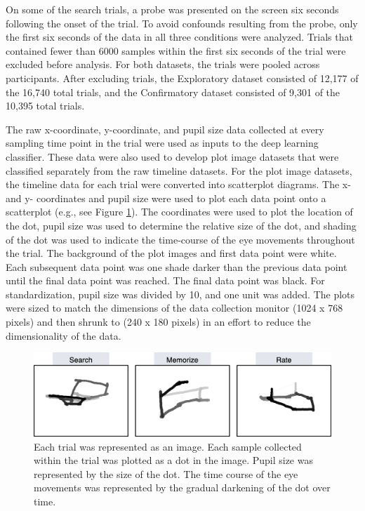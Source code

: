 \documentclass[
  english,
  man,floatsintext]{apa6}
\begin{document}
On some of the search trials, a probe was presented on the screen six seconds following the onset of the trial. To avoid confounds resulting from the probe, only the first six seconds of the data in all three conditions were analyzed. Trials that contained fewer than 6000 samples within the first six seconds of the trial were excluded before analysis. For both datasets, the trials were pooled across participants. After excluding trials, the Exploratory dataset consisted of 12,177 of the 16,740 total trials, and the Confirmatory dataset consisted of 9,301 of the 10,395 total trials.

The raw x-coordinate, y-coordinate, and pupil size data collected at every sampling time point in the trial were used as inputs to the deep learning classifier. These data were also used to develop plot image datasets that were classified separately from the raw timeline datasets. For the plot image datasets, the timeline data for each trial were converted into scatterplot diagrams. The x- and y- coordinates and pupil size were used to plot each data point onto a scatterplot (e.g., see Figure \ref{fig:ave-condition}). The coordinates were used to plot the location of the dot, pupil size was used to determine the relative size of the dot, and shading of the dot was used to indicate the time-course of the eye movements throughout the trial. The background of the plot images and first data point were white. Each subsequent data point was one shade darker than the previous data point until the final data point was reached. The final data point was black. For standardization, pupil size was divided by 10, and one unit was added. The plots were sized to match the dimensions of the data collection monitor (1024 x 768 pixels) and then shrunk to (240 x 180 pixels) in an effort to reduce the dimensionality of the data.

\begin{figure}
\centering
\includegraphics{figures/cond_imgs.png}
\caption{\label{fig:ave-condition}Each trial was represented as an image. Each sample collected within the trial was plotted as a dot in the image. Pupil size was represented by the size of the dot. The time course of the eye movements was represented by the gradual darkening of the dot over time.}
\end{figure}
\end{document}
